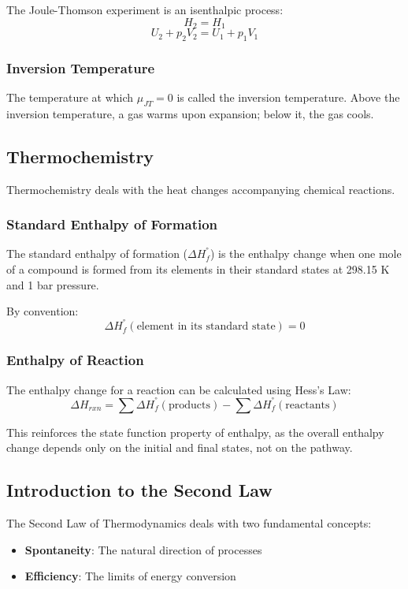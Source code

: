 \documentclass{article}
\theoremstyle{definition}
\begin{document}
The Joule-Thomson experiment is an isenthalpic process:
\[
H_2 = H_1
\]
\[
U_2 + p_2V_2 = U_1 + p_1V_1
\]

\subsubsection{Inversion Temperature}

The temperature at which $\mu_{JT} = 0$ is called the inversion temperature. Above the inversion temperature, a gas warms upon expansion; below it, the gas cools.

\subsection{Thermochemistry}

Thermochemistry deals with the heat changes accompanying chemical reactions.

\subsubsection{Standard Enthalpy of Formation}

The standard enthalpy of formation ($\Delta H_f^°$) is the enthalpy change when one mole of a compound is formed from its elements in their standard states at 298.15 K and 1 bar pressure.

By convention:
\[
\Delta H_f^°(\text{element in its standard state}) = 0
\]

\subsubsection{Enthalpy of Reaction}

The enthalpy change for a reaction can be calculated using Hess's Law:
\[
\Delta H_{rxn} = \sum \Delta H_f^°(\text{products}) - \sum \Delta H_f^°(\text{reactants})
\]

This reinforces the state function property of enthalpy, as the overall enthalpy change depends only on the initial and final states, not on the pathway.

\subsection{Introduction to the Second Law}

The Second Law of Thermodynamics deals with two fundamental concepts:
\begin{itemize}
    \item \textbf{Spontaneity}: The natural direction of processes
    \item \textbf{Efficiency}: The limits of energy conversion
\end{itemize}
\end{document}
